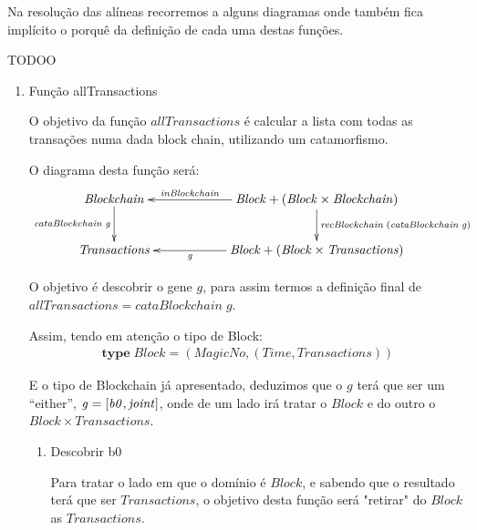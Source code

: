 \documentclass[a4paper]{article}
\newcommand{\Conid}[1]{\mathit{#1}}
\newcommand{\Varid}[1]{\mathit{#1}}
\begin{document}
\vspace{0.2cm}

Na resolução das alíneas recorremos a alguns diagramas onde também fica
implícito o porquê da definição de cada uma destas funções.

TODOO


\begin{enumerate}
\item Função allTransactions

O objetivo da função \ensuremath{\Varid{allTransactions}} é calcular a lista com todas as transações
numa dada block chain, utilizando um catamorfismo.

O diagrama desta função será:
\begin{eqnarray*}
\xymatrix@C=2cm{
    \ensuremath{\Conid{Blockchain}}
           \ar[d]_-{\ensuremath{\Varid{cataBlockchain}\;\Varid{g}}}
&
    \ensuremath{\Conid{Block}\mathbin{+}(\Conid{Block}\times\Conid{Blockchain})}
           \ar[d]^{\ensuremath{\Varid{recBlockchain}\;(\Varid{cataBlockchain}\;\Varid{g})}}
           \ar[l]_-{\ensuremath{\Varid{inBlockchain}}}
\\
     \ensuremath{\Conid{Transactions}}
&
     \ensuremath{\Conid{Block}\mathbin{+}(\Conid{Block}\times\Conid{Transactions})}
           \ar[l]^-{\ensuremath{\Varid{g}}}
}
\end{eqnarray*}


O objetivo é descobrir o gene \ensuremath{\Varid{g}}, para assim termos a definição final de
\ensuremath{\Varid{allTransactions}\mathrel{=}\Varid{cataBlockchain}\;\Varid{g}}.

Assim, tendo em atenção o tipo de Block:
\begin{eqnarray*}
\ensuremath{\mathbf{type}\;\Conid{Block}\mathrel{=}(\Conid{MagicNo},(\Conid{Time},\Conid{Transactions}))}
\end{eqnarray*}

E o tipo de Blockchain já apresentado, deduzimos que o \ensuremath{\Varid{g}} terá que ser um ``either'',
\ensuremath{\Varid{g}\mathrel{=}\alt{\Varid{b0}}{\Varid{joint}}},
onde de um lado irá tratar o \ensuremath{\Conid{Block}} e do outro o \ensuremath{\Conid{Block}\times\Conid{Transactions}}.

\begin{enumerate}
\item Descobrir b0

Para tratar o lado em que o domínio é \ensuremath{\Conid{Block}}, e sabendo que o resultado terá que
ser \ensuremath{\Conid{Transactions}}, o objetivo desta função será "retirar" do \ensuremath{\Conid{Block}} as \ensuremath{\Conid{Transactions}}.


\end{enumerate}
\end{enumerate}
\end{document}

